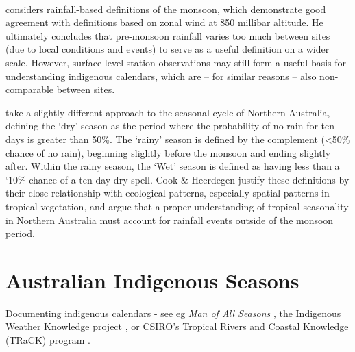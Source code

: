 

~\\

\citet{holland1985} considers rainfall-based definitions of the
monsoon, which demonstrate good agreement with definitions based on zonal
wind at 850 millibar altitude.  He ultimately concludes that pre-monsoon
rainfall varies too much between sites (due to local conditions and events)
to serve as a useful definition on a wider scale.
%
However, surface-level station observations may still form a useful basis for
understanding indigenous calendars, which are -- for similar reasons -- also
non-comparable between sites.

\citet{cook2001} take a slightly different approach to the seasonal cycle of
Northern Australia, defining the `dry' season as the period where the probability
of no rain for ten days is greater than 50\%.  The `rainy' season is defined by
the complement (\textless50\% chance of no rain), beginning slightly before the
monsoon and ending slightly after.  Within the rainy season, the `Wet' season
is defined as having less than a `10\% chance of a ten-day dry spell.
%
Cook \& Heerdegen justify these definitions by their close relationship with
ecological patterns, especially spatial patterns in tropical vegetation,
and argue that a proper understanding of tropical seasonality in Northern
Australia must account for rainfall events outside of the monsoon period.



\section{Australian Indigenous Seasons}
\label{sec:aus-indig-seasons}



Documenting indigenous calendars - see eg \textit{Man of All Seasons} \citep{davis1989},
the Indigenous Weather Knowledge project \citet{BOM-iwk},
or CSIRO's Tropical Rivers and Coastal Knowledge (TRaCK) program \citep{CSIROcals,oconnor2010}.


